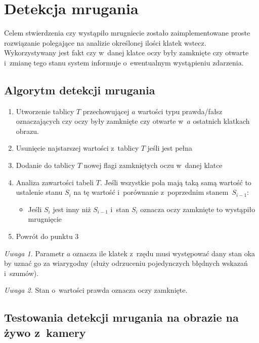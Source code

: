 \newpage

\section{Detekcja mrugania}

Celem stwierdzenia czy wystąpiło mrugniecie zostało zaimplementowane proste rozwiązanie polegające na analizie określonej ilości klatek wstecz. Wykorzystywany jest fakt czy w~danej klatce oczy były zamknięte czy otwarte i~zmianę tego stanu system informuje o~ewentualnym wystąpieniu zdarzenia. 

\subsection{Algorytm detekcji mrugania}

\begin{enumerate}
    \item Utworzenie tablicy $T$ przechowującej $a$ wartości typu prawda/fałsz oznaczających czy oczy były zamknięte czy otwarte w~$a$ ostatnich klatkach obrazu.
    \item Usunięcie najstarszej wartości z~tablicy $T$ jeśli jest pełna
    \item Dodanie do tablicy $T$ nowej flagi zamkniętych oczu w~danej klatce
    \item Analiza zawartości tabeli $T$. Jeśli wszystkie pola mają taką samą wartość to ustalenie stanu $S_{i}$ na tę wartość i~porównanie z~poprzednim stanem~$S_{i-1}$:
        \begin{itemize}
            \item Jeśli $S_{i}$ jest inny niż $S_{i-1}$ i~stan $S_{i}$ oznacza oczy zamknięte to wystąpiło mrugnięcie
        \end{itemize}
    \item Powrót do punktu 3
\end{enumerate}

\vspace{3mm}

\textit{Uwaga 1.} Parametr $a$ oznacza ile klatek z~rzędu musi występować dany stan oka by uznać go za wiarygodny (służy odrzuceniu pojedynczych błędnych wskazań i~szumów).

\par

\textit{Uwaga 2.} Stan o~wartości prawda oznacza oczy zamknięte.



\subsection{Testowania detekcji mrugania na obrazie na żywo z~kamery} \label{section:test_eye_blink}

